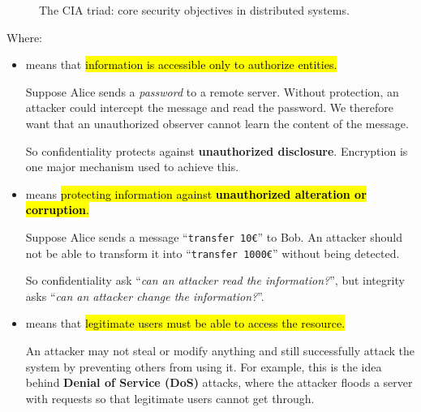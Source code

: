 \begin{figure}[!htp]
    \caption{The CIA triad: core security objectives in distributed systems.}
\end{figure}

\noindent
Where:
\begin{itemize}
    \item {} means that \hl{information is accessible only to authorize entities.}

        \begin{examplebox}[: Confidentiality]
            Suppose Alice sends a \emph{password} to a remote server. Without protection, an attacker could intercept the message and read the password. We therefore want that an unauthorized observer cannot learn the content of the message.

            So confidentiality protects against \textbf{unauthorized disclosure}. Encryption is one major mechanism used to achieve this.
        \end{examplebox}

    \item {} means \hl{protecting information against \textbf{unauthorized alteration or corruption}.}

        \begin{examplebox}[: Integrity]
            Suppose Alice sends a message ``\texttt{transfer 10\euro}'' to Bob. An attacker should not be able to transform it into ``\texttt{transfer 1000\euro}'' without being detected.

            So confidentiality ask ``\emph{can an attacker read the information?}'', but integrity asks ``\emph{can an attacker change the information?}''.
        \end{examplebox}

    \item {} means that \hl{legitimate users must be able to access the resource.}

        \begin{examplebox}[: Availability]
            An attacker may not steal or modify anything and still successfully attack the system by preventing others from using it. For example, this is the idea behind \textbf{Denial of Service (DoS)} attacks, where the attacker floods a server with requests so that legitimate users cannot get through.


\end{examplebox}
\end{itemize}
